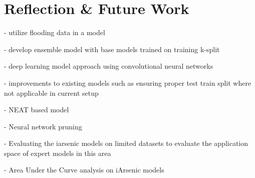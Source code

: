 \chapter{Reflection \& Future Work}

- utilize flooding data in a model

- develop ensemble model with base models trained on training k-split 

- deep learning model approach using convolutional neural networks

- improvements to existing models such as ensuring proper test train split where not applicable in current setup

- NEAT based model

- Neural network pruning

- Evaluating the iarsenic models on limited datasets to evaluate the application space of expert models in this area

- Area Under the Curve analysis on iArsenic models